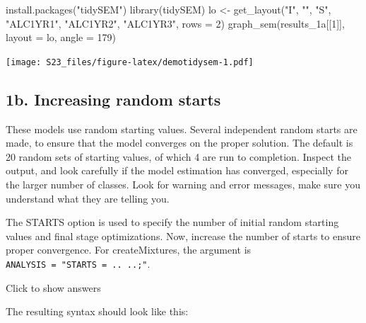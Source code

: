 \documentclass[
]{book}
\newenvironment{Shaded}{\begin{snugshade}}{\end{snugshade}}
\newcommand{\AttributeTok}[1]{\textcolor[rgb]{0.77,0.63,0.00}{#1}}
\newcommand{\DecValTok}[1]{\textcolor[rgb]{0.00,0.00,0.81}{#1}}
\newcommand{\FunctionTok}[1]{\textcolor[rgb]{0.00,0.00,0.00}{#1}}
\newcommand{\NormalTok}[1]{#1}
\newcommand{\OtherTok}[1]{\textcolor[rgb]{0.56,0.35,0.01}{#1}}
\newcommand{\StringTok}[1]{\textcolor[rgb]{0.31,0.60,0.02}{#1}}
\begin{document}
\begin{Shaded}
\begin{Highlighting}[]
\FunctionTok{install.packages}\NormalTok{(}\StringTok{"tidySEM"}\NormalTok{)}
\FunctionTok{library}\NormalTok{(tidySEM)}
\NormalTok{lo }\OtherTok{\textless{}{-}} \FunctionTok{get\_layout}\NormalTok{(}\StringTok{"I"}\NormalTok{,       }\StringTok{""}\NormalTok{,        }\StringTok{"S"}\NormalTok{,}
                 \StringTok{"ALC1YR1"}\NormalTok{, }\StringTok{"ALC1YR2"}\NormalTok{, }\StringTok{"ALC1YR3"}\NormalTok{, }\AttributeTok{rows =} \DecValTok{2}\NormalTok{)}
\FunctionTok{graph\_sem}\NormalTok{(results\_1a[[}\DecValTok{1}\NormalTok{]], }\AttributeTok{layout =}\NormalTok{ lo, }\AttributeTok{angle =} \DecValTok{179}\NormalTok{)}
\end{Highlighting}
\end{Shaded}

\texttt{[image: S23\_files/figure-latex/demotidysem-1.pdf]}

\hypertarget{b.-increasing-random-starts}{%
\subsection{1b. Increasing random starts}\label{b.-increasing-random-starts}}

These models use random starting values. Several independent random starts are made, to ensure that the model converges on the proper solution. The default is 20 random sets of starting values, of which 4 are run to completion. Inspect the output, and look carefully if the model estimation has converged, especially for the larger number of classes. Look for warning and error messages, make sure you understand what they are telling you.

The STARTS option is used to specify the number of initial random starting values and final stage optimizations. Now, increase the number of starts to ensure proper convergence. For createMixtures, the argument is \texttt{ANALYSIS\ =\ "STARTS\ =\ ..\ ..;"}.

Click to show answers

The resulting syntax should look like this:
\end{document}
